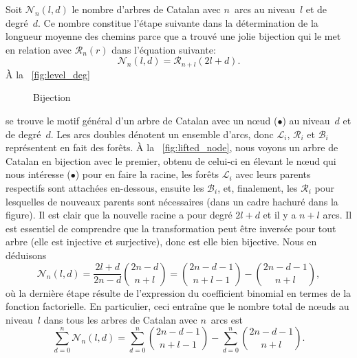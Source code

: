 Soit \(\mathcal{N}_n(l,d)\) le nombre d'arbres de Catalan avec
\(n\)~arcs au niveau~\(l\) et de degré~\(d\). Ce nombre constitue
l'étape suivante dans la détermination de la longueur moyenne des
chemins parce que \cite{Ruskey_1983} a trouvé une jolie bijection qui
le met en relation avec \(\mathcal{R}_n(r)\) dans l'équation suivante:
\begin{equation*}
\mathcal{N}_n(l,d) = \mathcal{R}_{n+l}(2l+d).
\end{equation*}
À la \fig~\ref{fig:level_deg}
\begin{figure}
\centering
{}
\quad
{}
\caption{Bijection}
\label{fig:bij_root_level}
\end{figure}
se trouve le motif général d'un arbre de Catalan avec un n{\oe}ud
(\(\bullet\)) au niveau~\(d\) et de degré~\(d\). Les arcs doubles
dénotent un ensemble d'arcs, donc \(\mathcal{L}_i\), \(\mathcal{R}_i\)
et \(\mathcal{B}_i\) représentent en fait des forêts. À la
\fig~\ref{fig:lifted_node}, nous voyons un arbre de Catalan en
bijection avec le premier, obtenu de celui-ci en élevant le n{\oe}ud
qui nous intéresse (\(\bullet\)) pour en faire la racine, les forêts
\(\mathcal{L}_i\) avec leurs parents respectifs sont attachées
en-dessous, ensuite les \(\mathcal{B}_i\), et, finalement, les
\(\mathcal{R}_i\) pour lesquelles de nouveaux parents sont nécessaires
(dans un cadre hachuré dans la figure). Il est clair que la nouvelle
racine a pour degré \(2l+d\) et il y a \(n+l\) arcs. Il est essentiel
de comprendre que la transformation peut être inversée pour tout arbre
(elle est injective et surjective), donc est elle bien bijective. Nous
en déduisons
\begin{equation*}
\mathcal{N}_n(l,d) = \frac{2l+d}{2n-d}\binom{2n-d}{n+l}
= \binom{2n-d-1}{n+l-1} - \binom{2n-d-1}{n+l},
\end{equation*}
où la dernière étape résulte de l'expression du coefficient binomial en termes de la fonction factorielle. En particulier, ceci entraîne que le nombre total de n{\oe}uds au niveau~\(l\) dans tous les arbres de Catalan avec \(n\)~arcs est
\begin{equation*}
\sum_{d=0}^{n}\mathcal{N}_n(l,d)
  = \sum_{d=0}^{n}\binom{2n-d-1}{n+l-1}
    - \sum_{d=0}^{n}\binom{2n-d-1}{n+l}.
\end{equation*}
